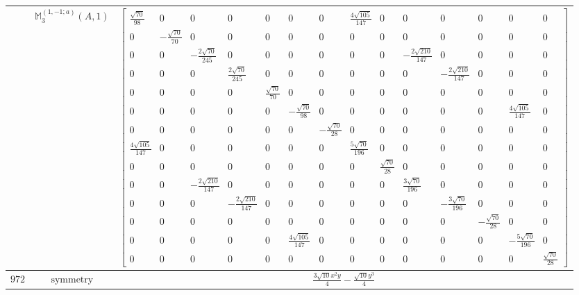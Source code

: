 \documentclass[fleqn,8pt,landscape]{jsarticle}
\begin{document}
\begin{longtable}{ccc}
$  $ & $ \mathbb{M}_{3}^{(1,-1;a)}(A,1) $ & $ \begin{bmatrix} \frac{\sqrt{70}}{98} & 0 & 0 & 0 & 0 & 0 & 0 & \frac{4 \sqrt{105}}{147} & 0 & 0 & 0 & 0 & 0 & 0 \\ 0 & - \frac{\sqrt{70}}{70} & 0 & 0 & 0 & 0 & 0 & 0 & 0 & 0 & 0 & 0 & 0 & 0 \\ 0 & 0 & - \frac{2 \sqrt{70}}{245} & 0 & 0 & 0 & 0 & 0 & 0 & - \frac{2 \sqrt{210}}{147} & 0 & 0 & 0 & 0 \\ 0 & 0 & 0 & \frac{2 \sqrt{70}}{245} & 0 & 0 & 0 & 0 & 0 & 0 & - \frac{2 \sqrt{210}}{147} & 0 & 0 & 0 \\ 0 & 0 & 0 & 0 & \frac{\sqrt{70}}{70} & 0 & 0 & 0 & 0 & 0 & 0 & 0 & 0 & 0 \\ 0 & 0 & 0 & 0 & 0 & - \frac{\sqrt{70}}{98} & 0 & 0 & 0 & 0 & 0 & 0 & \frac{4 \sqrt{105}}{147} & 0 \\ 0 & 0 & 0 & 0 & 0 & 0 & - \frac{\sqrt{70}}{28} & 0 & 0 & 0 & 0 & 0 & 0 & 0 \\ \frac{4 \sqrt{105}}{147} & 0 & 0 & 0 & 0 & 0 & 0 & \frac{5 \sqrt{70}}{196} & 0 & 0 & 0 & 0 & 0 & 0 \\ 0 & 0 & 0 & 0 & 0 & 0 & 0 & 0 & \frac{\sqrt{70}}{28} & 0 & 0 & 0 & 0 & 0 \\ 0 & 0 & - \frac{2 \sqrt{210}}{147} & 0 & 0 & 0 & 0 & 0 & 0 & \frac{3 \sqrt{70}}{196} & 0 & 0 & 0 & 0 \\ 0 & 0 & 0 & - \frac{2 \sqrt{210}}{147} & 0 & 0 & 0 & 0 & 0 & 0 & - \frac{3 \sqrt{70}}{196} & 0 & 0 & 0 \\ 0 & 0 & 0 & 0 & 0 & 0 & 0 & 0 & 0 & 0 & 0 & - \frac{\sqrt{70}}{28} & 0 & 0 \\ 0 & 0 & 0 & 0 & 0 & \frac{4 \sqrt{105}}{147} & 0 & 0 & 0 & 0 & 0 & 0 & - \frac{5 \sqrt{70}}{196} & 0 \\ 0 & 0 & 0 & 0 & 0 & 0 & 0 & 0 & 0 & 0 & 0 & 0 & 0 & \frac{\sqrt{70}}{28} \end{bmatrix} $ \\ \hline
$ 972 $ & $ \text{symmetry} $ & $ \frac{3 \sqrt{10} x^{2} y}{4} - \frac{\sqrt{10} y^{3}}{4} $ \\

\end{longtable}
\end{document}
